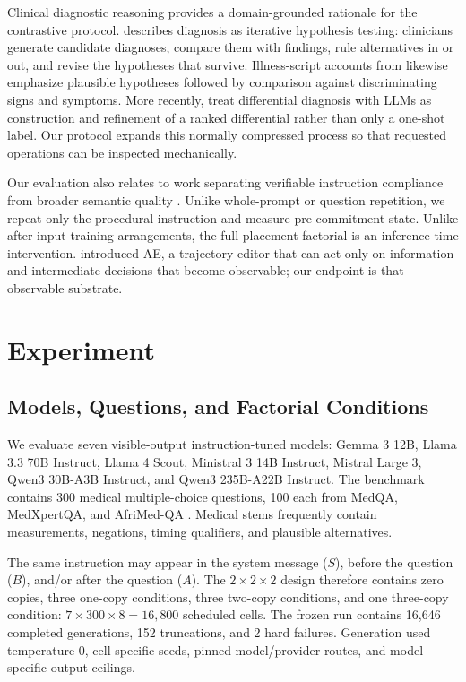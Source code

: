 \documentclass[10pt]{article}
\begin{document}
Clinical diagnostic reasoning provides a domain-grounded rationale for the contrastive protocol. \citet{kassirer1983hypothesis} describes diagnosis as iterative hypothesis testing: clinicians generate candidate diagnoses, compare them with findings, rule alternatives in or out, and revise the hypotheses that survive. Illness-script accounts from \citet{charlin2000scripts} likewise emphasize plausible hypotheses followed by comparison against discriminating signs and symptoms. More recently, \citet{mcduff2025ddx} treat differential diagnosis with LLMs as construction and refinement of a ranked differential rather than only a one-shot label. Our protocol expands this normally compressed process so that requested operations can be inspected mechanically.

Our evaluation also relates to work separating verifiable instruction compliance from broader semantic quality \citep{zhou2023ifeval,lou2023survey}. Unlike whole-prompt or question repetition, we repeat only the procedural instruction and measure pre-commitment state. Unlike after-input training arrangements, the full placement factorial is an inference-time intervention. \citet{lavrenko2026ae} introduced AE, a trajectory editor that can act only on information and intermediate decisions that become observable; our endpoint is that observable substrate.

\section{Experiment}
\subsection{Models, Questions, and Factorial Conditions}
We evaluate seven visible-output instruction-tuned models: Gemma 3 12B, Llama 3.3 70B Instruct, Llama 4 Scout, Ministral 3 14B Instruct, Mistral Large 3, Qwen3 30B-A3B Instruct, and Qwen3 235B-A22B Instruct. The benchmark contains 300 medical multiple-choice questions, 100 each from MedQA, MedXpertQA, and AfriMed-QA \citep{jin2021medqa,zuo2025medxpertqa,nimo2025afrimed}. Medical stems frequently contain measurements, negations, timing qualifiers, and plausible alternatives.

The same instruction may appear in the system message ($S$), before the question ($B$), and/or after the question ($A$). The $2\times2\times2$ design therefore contains zero copies, three one-copy conditions, three two-copy conditions, and one three-copy condition: $7\times300\times8=16{,}800$ scheduled cells. The frozen run contains 16,646 completed generations, 152 truncations, and 2 hard failures. Generation used temperature 0, cell-specific seeds, pinned model/provider routes, and model-specific output ceilings.
\end{document}
